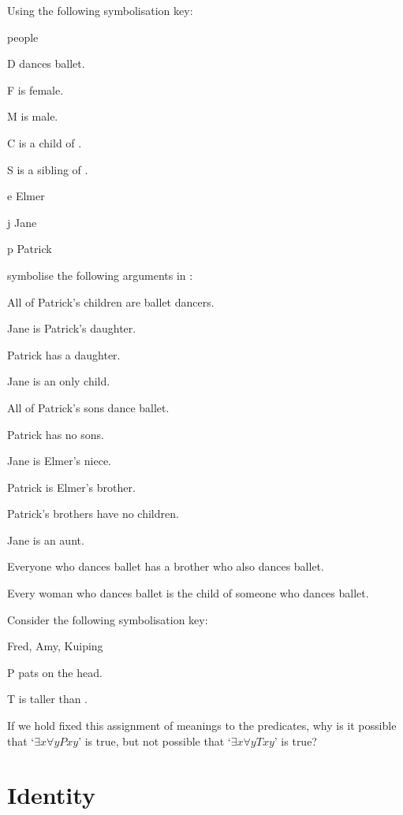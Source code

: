 \solutions
\problempart
\label{pr.FOLballet}
Using the following symbolisation key:
\begin{ekey}
\item[\text{domain}] people
\item[D]  dances ballet.
\item[F]  is female.
\item[M]  is male.
\item[C]  is a child of .
\item[S]  is a sibling of .
\item[e] Elmer
\item[j] Jane
\item[p] Patrick
\end{ekey}
symbolise the following arguments in \FOL:
\begin{earg}
\item All of Patrick's children are ballet dancers.
\item Jane is Patrick's daughter.
\item Patrick has a daughter.
\item Jane is an only child.
\item All of Patrick's sons dance ballet.
\item Patrick has no sons.
\item Jane is Elmer's niece.
\item Patrick is Elmer's brother.
\item Patrick's brothers have no children.
\item Jane is an aunt.
\item Everyone who dances ballet has a brother who also dances ballet.
\item Every woman who dances ballet is the child of someone who dances ballet.
\end{earg}

\problempart
Consider the following symbolisation key:
\begin{ekey}
\item[\text{domain}] Fred, Amy, Kuiping
\item[P]  pats  on the head.
\item[T]  is taller than .
\end{ekey}
If we hold fixed this assignment of meanings to the predicates, why is it possible that `$\exists x \forall y Pxy$' is true, but not possible that  `$\exists x \forall y Txy$' is true?

\chapter{Identity}\label{sec.identity}

